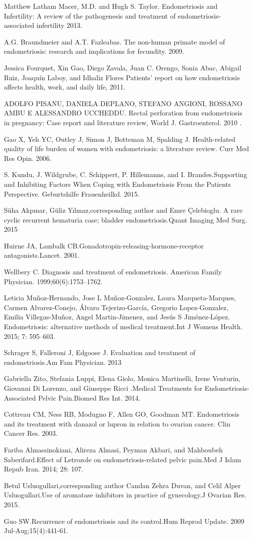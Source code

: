 \documentclass[12pt]{article} %
\begin{document}
Matthew Latham Macer, M.D. and Hugh S. Taylor. Endometriosis and Infertility: A review of the pathogenesis and treatment of endometriosis-associated infertility 2013.

A.G. Braundmeier and A.T. Fazleabas. The non-human primate model of endometriosis: research and implications for fecundity. 2009.

Jessica Fourquet, Xin Gao, Diego Zavala, Juan C. Orengo, Sonia Abac, Abigail Ruiz, Joaquín Laboy, and Idhaliz Flores Patients’ report on how endometriosis affects health, work, and daily life, 2011.


ADOLFO PISANU, DANIELA DEPLANO, STEFANO ANGIONI, ROSSANO AMBU E ALESSANDRO UCCHEDDU. Rectal perforation from endometriosis in pregnancy: Case report and literature review, World J. Gastroenterol. 2010 .

Gao X, Yeh YC, Outley J, Simon J, Botteman M, Spalding J. Health-related quality of life burden of women with endometriosis: a literature review. Curr Med Res Opin. 2006.

S. Kundu, J. Wildgrube, C. Schippert, P. Hillemanns, and I. Brandes.Supporting and Inhibiting Factors When Coping with Endometriosis From the Patients Perspective. Geburtshilfe Frauenheilkd. 2015.

Süha Akpınar, Güliz Yılmaz,corresponding author and Emre Çelebioglu. A rare cyclic recurrent hematuria case; bladder endometriosis.Quant Imaging Med Surg. 2015 

Huirne JA, Lambalk CB.Gonadotropin-releasing-hormone-receptor antagonists.Lancet. 2001.

Wellbery C. Diagnosis and treatment of endometriosis. American Family Physician. 1999;60(6):1753–1762.

Leticia Muñoz-Hernando, Jose L Muñoz-Gonzalez, Laura Marqueta-Marques, Carmen Alvarez-Conejo, Álvaro Tejerizo-García, Gregorio Lopez-Gonzalez, Emilia Villegas-Muñoz, Angel Martin-Jimenez, and Jesús S Jiménez-López. Endometriosis: alternative methods of medical treatment.Int J Womens Health. 2015; 7: 595–603. 

Schrager S, Falleroni J, Edgoose J. Evaluation and treatment of endometriosis.Am Fam Physician. 2013

Gabriella Zito, Stefania Luppi, Elena Giolo, Monica Martinelli, Irene Venturin, Giovanni Di Lorenzo, and Giuseppe Ricci .Medical Treatments for Endometriosis-Associated Pelvic Pain.Biomed Res Int. 2014.

Cottreau CM, Ness RB, Modugno F, Allen GO, Goodman MT. Endometriosis and its treatment with danazol or lupron in relation to ovarian cancer. Clin Cancer Res. 2003.

Fariba Almassinokiani, Alireza Almasi, Peyman Akbari, and Mahboubeh Saberifard.Effect of Letrozole on endometriosis-related pelvic pain.Med J Islam Repub Iran. 2014; 28: 107. 

Betul Usluogullari,corresponding author Candan Zehra Duvan, and Celil Alper Usluogullari.Use of aromatase inhibitors in practice of gynecology.J Ovarian Res. 2015.

Guo SW.Recurrence of endometriosis and its control.Hum Reprod Update. 2009 Jul-Aug;15(4):441-61.
\end{document}

